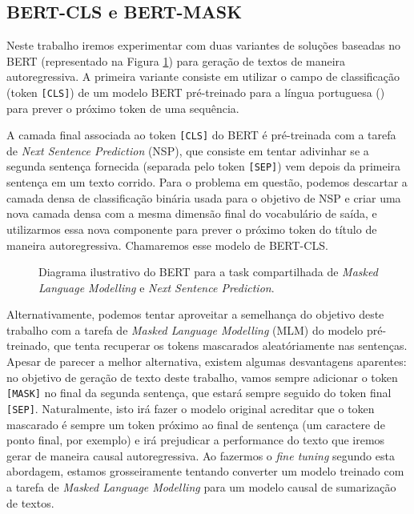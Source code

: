 \documentclass{article}
\begin{document}
\subsection{BERT-CLS e BERT-MASK}

Neste trabalho iremos experimentar com duas variantes de soluções baseadas no BERT (representado na Figura \ref{bert_fig}) para geração de textos de maneira autoregressiva. A primeira variante consiste em utilizar o campo de classificação (token \texttt{[CLS]}) de um modelo BERT pré-treinado para a língua portuguesa (\textcite{souza2020bertimbau}) para prever o próximo token de uma sequência.

A camada final associada ao token \texttt{[CLS]} do BERT é pré-treinada com a tarefa de \textit{Next Sentence Prediction} (NSP), que consiste em tentar adivinhar se a segunda sentença fornecida (separada pelo token \texttt{[SEP]}) vem depois da primeira sentença em um texto corrido. Para o problema em questão, podemos descartar a camada densa de classificação binária usada para o objetivo de NSP e criar uma nova camada densa com a mesma dimensão final do vocabulário de saída, e utilizarmos essa nova componente para prever o próximo token do título de maneira autoregressiva. Chamaremos esse modelo de BERT-CLS.

\begin{figure}[h]
	\centering
	
	\caption{Diagrama ilustrativo do BERT para a task compartilhada de \textit{Masked Language Modelling} e \textit{Next Sentence Prediction}. }
	\label{bert_fig}
\end{figure}

Alternativamente, podemos tentar aproveitar a semelhança do objetivo deste trabalho com a tarefa de \textit{Masked Language Modelling} (MLM) do modelo pré-treinado, que tenta recuperar os tokens mascarados aleatóriamente nas sentenças. Apesar de parecer a melhor alternativa, existem algumas desvantagens aparentes: no objetivo de geração de texto deste trabalho, vamos sempre adicionar o token \texttt{[MASK]} no final da segunda sentença, que estará sempre seguido do token final \texttt{[SEP]}. Naturalmente, isto irá fazer o modelo original acreditar que o token mascarado é sempre um token próximo ao final de sentença (um caractere de ponto final, por exemplo) e irá prejudicar a performance do texto que iremos gerar de maneira causal autoregressiva. Ao fazermos o \textit{fine tuning} segundo esta abordagem, estamos grosseiramente tentando converter um modelo treinado com a tarefa de \textit{Masked Language Modelling} para um modelo causal de sumarização de textos.
\end{document}
